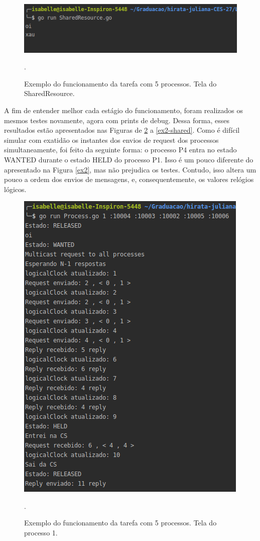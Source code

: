 \documentclass[conference]{IEEEtran}
\begin{document}
\begin{figure}[H]
\centering
\centerline{\includegraphics[scale=0.5]{imagens/ex2-shared-clean.png}}
\caption{Exemplo do funcionamento da tarefa com 5 processos. Tela do SharedResource.}.
\label{ex2-shared-clean}
\end{figure}

	A fim de entender melhor cada estágio do funcionamento, foram realizados os mesmos testes novamente, agora com prints de debug. Dessa forma, esses resultados estão apresentados nas Figuras de \ref{ex2-proc1} a \ref{ex2-shared}. Como é difícil simular com exatidão os instantes dos envios de request dos processos simultaneamente, foi feito da seguinte forma: o processo P4 entra no estado WANTED durante o estado HELD do processo P1. Isso é um pouco diferente do apresentado na Figura \ref{ex2}, mas não prejudica os testes. Contudo, isso altera um pouco a ordem dos envios de mensagens, e, consequentemente, os valores relógios lógicos.

\begin{figure}[H]
\centering
\centerline{\includegraphics[scale=0.4]{imagens/ex2-proc1.png}}
\caption{Exemplo do funcionamento da tarefa com 5 processos. Tela do processo 1.}.
\label{ex2-proc1}
\end{figure}
\end{document}
